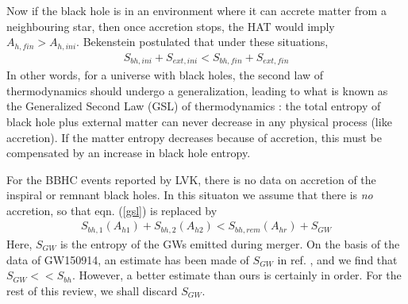 \documentclass[11pt]{article}
\begin{document}
Now if the black hole is in an environment where it can accrete matter from a neighbouring star, then once accretion stops, the HAT would imply $A_{h,fin} > A_{h,ini}$. Bekenstein \cite{bek73} postulated that under these situations,
\begin{eqnarray}
S_{bh,ini} + S_{ext,ini} < S_{bh,fin} +S_{ext,fin} \label{gsl}
\end{eqnarray}
In other words, for a universe with black holes, the second law of thermodynamics should undergo a generalization, leading to what is known as the Generalized Second Law (GSL) of thermodynamics : the total entropy of black hole plus external matter can never decrease in any physical process (like accretion). If the matter entropy decreases because of accretion, this must be compensated by an increase in black hole entropy. 

For the BBHC events reported by LVK, there is no data on accretion of the inspiral or remnant black holes. In this situaton we assume that there is {\it no} accretion, so that eqn. (\ref{gsl}) is replaced by  
\begin{eqnarray}
S_{bh,1}(A_{h1}) + S_{bh,2}(A_{h2}) < S_{bh,rem}(A_{hr}) +S_{GW} \label{gslbb}
\end{eqnarray}
Here, $S_{GW}$ is the entropy of the GWs emitted during merger. On the basis of the data of GW150914, an estimate has been made of $S_{GW}$ in ref. \cite{mr21}, and we find that $S_{GW} << S_{bh}$. However, a better estimate than ours is certainly in order. For the rest of this review, we shall discard $S_{GW}$. 
\end{document}
